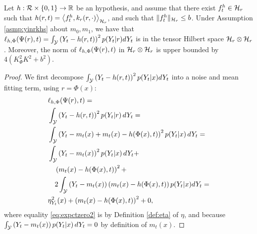 \begin{thmapplem}\label{lem:mmdbound}
Let $h : \mathcal{R} \times \{0,1\} \rightarrow \mathbb{R}$ be an hypothesis, and assume that there exist $f^h_t \in \mathcal H_r$ such that $h(r,t) = \left<f^h_t,k_r(r,\cdot)\right>_{\mathcal H_r}$, and such that $\|f^h_t\|_{\mathcal H_r} \leq b$.
Under Assumption \ref{asmp:yinrkhs} about $m_0,m_1$, we have that $\ell_{h,\Phi}(\Psi(r),t) = \int_\mathcal Y \left(Y_t - h(r,t)\right)^2 p(Y_t|r) dY_t$ is in the tensor Hilbert space $\mathcal H_r \otimes \mathcal H_r$. Moreover, the norm of $\ell_{h,\Phi}(\Psi(r),t)$ in $\mathcal H_r \otimes \mathcal H_r$ is upper bounded by $4\left(K_\Phi^2 K^2 + b^2\right)$.
\end{thmapplem}
\begin{proof}
We first decompose $\int_\mathcal Y \left(Y_t - h(r,t)\right)^2 p(Y_t|x) dY_t$ into a noise and mean fitting term, using $r=\Phi(x)$:
\begin{align}
&\ell_{h,\Phi}(\Psi(r),t) = \nonumber \\
&\int_\mathcal Y \left(Y_t - h(r,t)\right)^2 p(Y_t|r) \, dY_t = \nonumber \\
&\int_\mathcal Y \left(Y_t - m_t(x) + m_t(x) - h(\Phi(x),t)\right)^2 p(Y_t|x) \, dY_t =\nonumber \\
&\int_\mathcal Y \left(Y_t - m_t(x) \right)^2 p(Y_t|x) \, dY_t + \nonumber \\
& \quad  \left(m_t(x) - h(\Phi(x),t)\right)^2  + \nonumber \\
& \quad 2 \int_\mathcal Y \left(Y_t - m_t(x) \right)\left(m_t(x) - h(\Phi(x),t)\right) p(Y_t|x) dY_t   =\label{eq:expctzero2} \\
& \eta^2_{Y_t}(x) +  \left(m_t(x) - h(\Phi(x),t)\right)^2  + 0, \label{eq:mmddecomp}
\end{align}
where equality \eqref{eq:expctzero2} is by Definition \ref{def:eta} of $\eta$, and because $\int_\mathcal Y \left(Y_t - m_t(x)\right) p(Y_t|x) \, dY_t = 0$ by definition of $m_t(x)$.


\end{proof}

